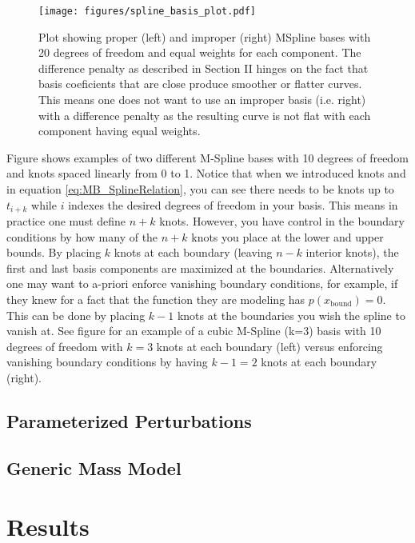 \documentclass[twocolumn, linenumber]{aastex63}
\begin{document}
\begin{figure*}[ht!]
    \begin{centering}
        \texttt{[image: figures/spline\_basis\_plot.pdf]}
        \caption{Plot showing proper (left) and improper (right) MSpline bases with 20 degrees of freedom and equal weights for each component. The 
            difference penalty as described in Section II hinges on the fact that basis coeficients that are close produce smoother or flatter 
            curves. This means one does not want to use an improper basis (i.e. right) with a difference penalty as the resulting curve is not flat 
            with each component having equal weights.}
        \label{fig:spline_basis}
    \end{centering}
\end{figure*}

Figure shows examples of two different M-Spline bases with 10 degrees of freedom and knots spaced linearly from 0 to 1. Notice 
that when we introduced knots and in equation \ref{eq:MB_SplineRelation}, you can see there needs to be knots up to $t_{i+k}$ while $i$ 
indexes the desired degrees of freedom in your basis. This means in practice one must define $n+k$ knots. However, you have control 
in the boundary conditions by how many of the $n+k$ knots you place at the lower and upper bounds. By placing $k$ knots at each boundary 
(leaving $n-k$ interior knots), the first and last basis components are maximized at the boundaries. Alternatively one may want to 
a-priori enforce vanishing boundary conditions, for example, if they knew for a fact that the function they are modeling has 
$p(x_\mathrm{bound}) = 0$.  This can be done by placing $k-1$ knots at the boundaries you wish the spline to vanish at. See figure for 
an example of a cubic M-Spline (k=3) basis with 10 degrees of freedom with $k=3$ knots at each boundary (left) versus enforcing vanishing 
boundary conditions by having $k-1=2$ knots at each boundary (right).


\subsection{Parameterized Perturbations} \label{sec:perturbation_model}
\subsection{Generic Mass Model} \label{sec:nonparametric_model}
\section{Results} \label{sec:results}
\end{document}
